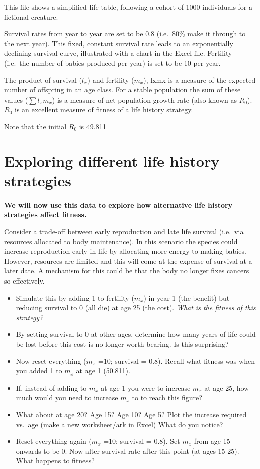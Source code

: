 \documentclass[
  a4paper]{book}
\begin{document}
This file shows a simplified life table, following a cohort of 1000 individuals for a fictional creature.

Survival rates from year to year are set to be 0.8 (i.e.~80\% make it through to the next year). This fixed, constant survival rate leads to an exponentially declining survival curve, illustrated with a chart in the Excel file. Fertility (i.e.~the number of babies produced per year) is set to be 10 per year.

The product of survival (\(l_x\)) and fertility (\(m_x\)), lxmx is a measure of the expected number of offspring in an age class. For a stable population the sum of these values (\(\sum l_x m_x\)) is a measure of net population growth rate (also known as \(R_0\)). \(R_0\) is an excellent measure of fitness of a life history strategy.

Note that the initial \(R_0\) is 49.811

\hypertarget{exploring-different-life-history-strategies}{%
\section{Exploring different life history strategies}\label{exploring-different-life-history-strategies}}

\textbf{We will now use this data to explore how alternative life history strategies affect fitness.}

Consider a trade-off between early reproduction and late life survival (i.e.~via resources allocated to body maintenance). In this scenario the species could increase reproduction early in life by allocating more energy to making babies. However, resources are limited and this will come at the expense of survival at a later date. A mechanism for this could be that the body no longer fixes cancers so effectively.

\begin{itemize}
\item
  Simulate this by adding 1 to fertility (\(m_x\)) in year 1 (the benefit) but reducing survival to 0 (all die) at age 25 (the cost). \emph{What is the fitness of this strategy?}
\item
  By setting survival to 0 at other ages, determine how many years of life could be lost before this cost is no longer worth bearing. Is this surprising?
\item
  Now reset everything (\(m_x\) =10; survival = 0.8). Recall what fitness was when you added 1 to \(m_x\) at age 1 (50.811).
\item
  If, instead of adding to \(m_x\) at age 1 you were to increase \(m_x\) at age 25, how much would you need to increase \(m_x\) to to reach this figure?
\item
  What about at age 20? Age 15? Age 10? Age 5?
  Plot the increase required vs.~age (make a new worksheet/ark in Excel) What do you notice?
\item
  Reset everything again (\(m_x\) =10; survival = 0.8). Set \(m_x\) from age 15 onwards to be 0. Now alter survival rate after this point (at ages 15-25). What happens to fitness?
\end{itemize}
\end{document}
